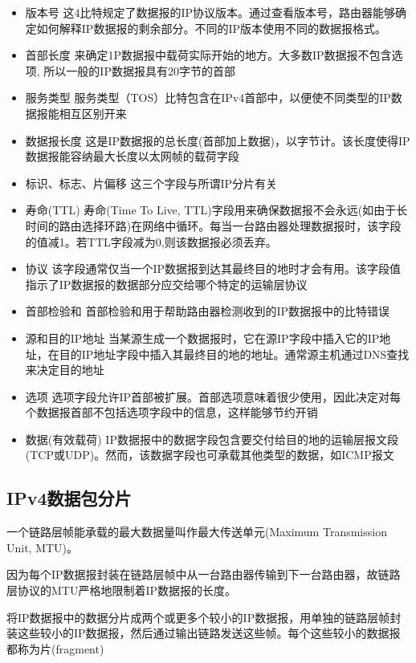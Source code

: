 \begin{itemize}
    \item 版本号
    \subitem 这4比特规定了数据报的IP协议版本。通过查看版本号，路由器能够确定如何解释IP数据报的剩余部分。不同的IP版本使用不同的数据报格式。
    \item 首部长度
    \subitem 来确定1P数据报中载荷实际开始的地方。大多数IP数据报不包含选项, 所以一般的IP数据报具有20字节的首部
    \item 服务类型
    \subitem 服务类型（TOS）比特包含在IPv4首部中，以便使不同类型的IP数据报能相互区别开来
    \item 数据报长度
    \subitem 这是IP数据报的总长度(首部加上数据)，以字节计。该长度使得IP数据报能容纳最大长度以太网帧的载荷字段
    \item 标识、标志、片偏移
    \subitem 这三个字段与所谓IP分片有关
    \item 寿命(TTL)
    \subitem 寿命(Time To Live, TTL)字段用来确保数据报不会永远(如由于长时间的路由选择环路)在网络中循环。每当一台路由器处理数据报时，该字段的值减1。若TTL字段减为0,则该数据报必须丢弃。
    \item 协议
    \subitem 该字段通常仅当一个IP数据报到达其最终目的地时才会有用。该字段值指示了IP数据报的数据部分应交给哪个特定的运输层协议
    \item 首部检验和
    \subitem 首部检验和用于帮助路由器检测收到的IP数据报中的比特错误
    \item 源和目的IP地址
    \subitem 当某源生成一个数据报时，它在源IP字段中插入它的IP地址，在目的IP地址字段中插入其最终目的地的地址。通常源主机通过DNS查找来决定目的地址
    \item 选项
    \subitem 选项字段允许IP首部被扩展。首部选项意味着很少使用，因此决定对每个数据报首部不包括选项字段中的信息，这样能够节约开销
    \item 数据(有效载荷)
    \subitem IP数据报中的数据字段包含要交付给目的地的运输层报文段(TCP或UDP)。然而，该数据字段也可承载其他类型的数据，如ICMP报文
\end{itemize}

\subsection{IPv4数据包分片}

    一个链路层帧能承载的最大数据量叫作最大传送单元(Maximum Transmission Unit, MTU)。

    因为每个IP数据报封装在链路层帧中从一台路由器传输到下一台路由器，故链路层协议的MTU严格地限制着IP数据报的长度。

    将IP数据报中的数据分片成两个或更多个较小的IP数据报，用单独的链路层帧封装这些较小的IP数据报，然后通过输出链路发送这些帧。每个这些较小的数据报都称为片(fragment)

